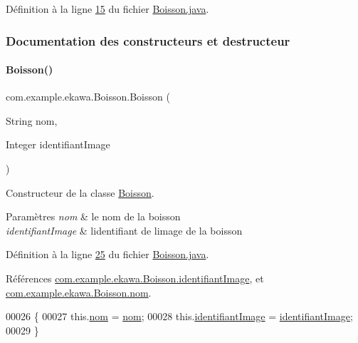 Définition à la ligne \hyperlink{_boisson_8java_source_l00015}{15} du fichier \hyperlink{_boisson_8java_source}{Boisson.\+java}.



\subsubsection{Documentation des constructeurs et destructeur}
\mbox{\label{classcom_1_1example_1_1ekawa_1_1_boisson_a4dd8019f54eb6d1293a179ffe5e8b918}} 
\paragraph{\texorpdfstring{Boisson()}{Boisson()}}
{\footnotesize\ttfamily com.\+example.\+ekawa.\+Boisson.\+Boisson (\begin{DoxyParamCaption}\item[{String}]{nom,  }\item[{Integer}]{identifiant\+Image }\end{DoxyParamCaption})}



Constructeur de la classe \hyperlink{classcom_1_1example_1_1ekawa_1_1_boisson}{Boisson}. 


\begin{DoxyParams}{Paramètres}
{\em nom} & le nom de la boisson \\
\hline
{\em identifiant\+Image} & l\textquotesingle{}identifiant de l\textquotesingle{}image de la boisson \\
\hline
\end{DoxyParams}


Définition à la ligne \hyperlink{_boisson_8java_source_l00025}{25} du fichier \hyperlink{_boisson_8java_source}{Boisson.\+java}.



Références \hyperlink{_boisson_8java_source_l00018}{com.\+example.\+ekawa.\+Boisson.\+identifiant\+Image}, et \hyperlink{_boisson_8java_source_l00017}{com.\+example.\+ekawa.\+Boisson.\+nom}.


\begin{DoxyCode}
00026     \{
00027         this.\hyperlink{classcom_1_1example_1_1ekawa_1_1_boisson_a9c932ca6665790c36acb6d4792a5a31a}{nom} = \hyperlink{classcom_1_1example_1_1ekawa_1_1_boisson_a9c932ca6665790c36acb6d4792a5a31a}{nom};
00028         this.\hyperlink{classcom_1_1example_1_1ekawa_1_1_boisson_ac73d259d39e459b00e5cfdf73a2aaf98}{identifiantImage} = \hyperlink{classcom_1_1example_1_1ekawa_1_1_boisson_ac73d259d39e459b00e5cfdf73a2aaf98}{identifiantImage};
00029     \}
\end{DoxyCode}


